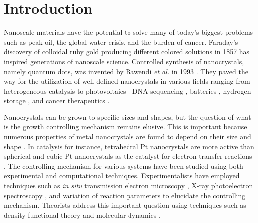 
\section{Introduction}


Nanoscale materials have the potential to solve many of today's biggest problems such as peak oil, the global water crisis, and the burden of cancer.
Faraday's discovery of colloidal ruby gold producing different colored solutions in 1857 \cite{Faraday_1857,Thompson_2007} has inspired generations of nanoscale science.
Controlled synthesis of nanocrystals, namely quantum dots, was invented by Bawendi \textit{et al.} in 1993 \cite{hakimi1993quantum,Murray_2000}.
They paved the way for the utilization of well-defined nanocrystals in various fields ranging from heterogeneous catalysis \cite{astruc2008nanoparticles,Astruc_2006} to photovoltaics \cite{Atwater_2010}, DNA sequencing \cite{McNally_2010}, batteries \cite{Panniello_2014}, hydrogen storage \cite{Jena_2011,Ramos_Castillo_2015}, and cancer therapeutics \cite{Jain_2010,Kim_2010}.

Nanocrystals can be grown to specific sizes and shapes, but the question of what is the growth controlling mechanism remains elusive.
This is important because numerous properties of metal nanocrystals are found to depend on their size \cite{Roduner_2006} and shape \cite{Xia_2008}.
In catalysis for instance, tetrahedral Pt nanocrystals are more active than spherical and cubic Pt nanocrystals as the catalyst for electron-transfer reactions \cite{Narayanan_2005}.
The controlling mechanism for various systems have been studied using both experimental and computational techniques.
Experimentalists have employed techniques such as \textit{in situ} transmission electron microscopy \cite{Liao_2014,Woehl_2014}, X-ray photoelectron spectroscopy \cite{Gao_2004,Park_2014,Huang_1996,Kedia_2012,Bonet_2000}, and variation of reaction parameters \cite{Personick_2013,Xia_2012,Zeng_2010,Zhang_1996,Chang_2011,Zhu_2011} to elucidate the controlling mechanism.
Theorists address this important question using techniques such as density functional theory \cite{Kilin_2008,Al_Saidi_2012,Saidi_2013,Zhang_2008} and molecular dynamics \cite{Zhou_2014}.

